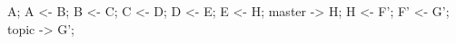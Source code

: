 	\rootCommit A;
	\commit A <- B;
	\commit B <- C;
	\commit C <- D;
	\commit D <- E;
	\commit E <- H;
	\branchref master -> H;
	\downCommit H <- F';
	\commit F' <- G';
	\branchref topic -> G';
\finefiguranofloattikz
